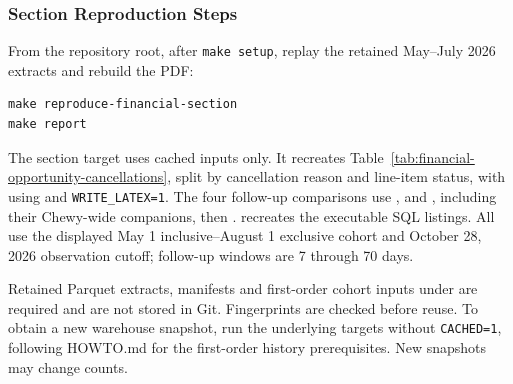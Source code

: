 \clearpage
\subsubsection{Section Reproduction Steps}\label{subsubsec:reproduce-financial}
From the repository root, after \texttt{make setup}, replay the retained May--July
2026 extracts and rebuild the PDF:
\begin{lstlisting}[basicstyle=\ttfamily\small,breaklines=true]
make reproduce-financial-section
make report
\end{lstlisting}
The section target uses cached inputs only. It recreates
Table~\ref{tab:financial-opportunity-cancellations}, split by cancellation reason
and line-item status, with
 using
 and \texttt{WRITE\_LATEX=1}.
The four follow-up comparisons use
,
 and
, including their Chewy-wide
companions, then .
 recreates the executable SQL listings.
All use the displayed May 1 inclusive--August 1 exclusive cohort and October 28,
2026 observation cutoff; follow-up windows are 7 through 70 days.

Retained Parquet extracts, manifests and first-order cohort inputs under
 are required and are not stored in Git.
Fingerprints are checked before reuse. To obtain a new warehouse snapshot,
run the underlying targets without \texttt{CACHED=1}, following HOWTO.md for the
first-order history prerequisites. New snapshots may change counts.
